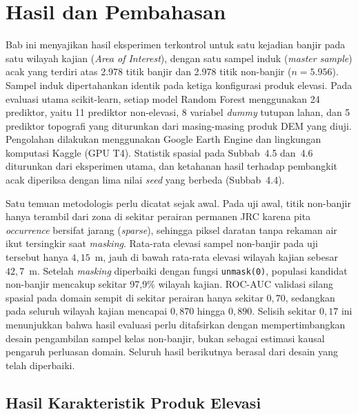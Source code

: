 \documentclass[12pt]{article}
\begin{document}

\clearpage
\section{Hasil dan Pembahasan}

Bab ini menyajikan hasil eksperimen terkontrol untuk satu kejadian banjir pada
satu wilayah kajian (\textit{Area of Interest}), dengan satu sampel induk
(\textit{master sample}) acak yang terdiri atas 2.978 titik banjir dan 2.978
titik non-banjir ($n=5.956$). Sampel induk dipertahankan identik pada ketiga
konfigurasi produk elevasi. Pada evaluasi utama scikit-learn, setiap model
Random Forest \cite{breiman2001} menggunakan 24 prediktor, yaitu 11 prediktor non-elevasi, 8 variabel
\textit{dummy} tutupan lahan, dan 5 prediktor topografi yang diturunkan dari
masing-masing produk DEM yang diuji. Pengolahan dilakukan menggunakan Google
Earth Engine dan lingkungan komputasi Kaggle (GPU T4). Statistik spasial pada
Subbab~4.5 dan~4.6 diturunkan dari eksperimen utama, dan ketahanan hasil
terhadap pembangkit acak diperiksa dengan lima nilai \textit{seed} yang
berbeda (Subbab~4.4).

Satu temuan metodologis perlu dicatat sejak awal. Pada uji awal, titik
non-banjir hanya terambil dari zona di sekitar perairan permanen JRC karena
pita \textit{occurrence} bersifat jarang (\textit{sparse}), sehingga piksel
daratan tanpa rekaman air ikut tersingkir saat \textit{masking}. Rata-rata
elevasi sampel non-banjir pada uji tersebut hanya $4{,}15$~m, jauh di bawah
rata-rata elevasi wilayah kajian sebesar $42{,}7$~m. Setelah \textit{masking}
diperbaiki dengan fungsi \texttt{unmask(0)}, populasi kandidat non-banjir
mencakup sekitar 97,9\% wilayah kajian. ROC-AUC validasi silang spasial pada
domain sempit di sekitar perairan hanya sekitar $0{,}70$, sedangkan pada
seluruh wilayah kajian mencapai $0{,}870$ hingga $0{,}890$. Selisih sekitar
$0{,}17$ ini menunjukkan bahwa hasil evaluasi perlu ditafsirkan dengan
mempertimbangkan desain pengambilan sampel kelas non-banjir, bukan sebagai
estimasi kausal pengaruh perluasan domain. Seluruh
hasil berikutnya berasal dari desain yang telah diperbaiki.

\subsection{Hasil Karakteristik Produk Elevasi}
\end{document}
